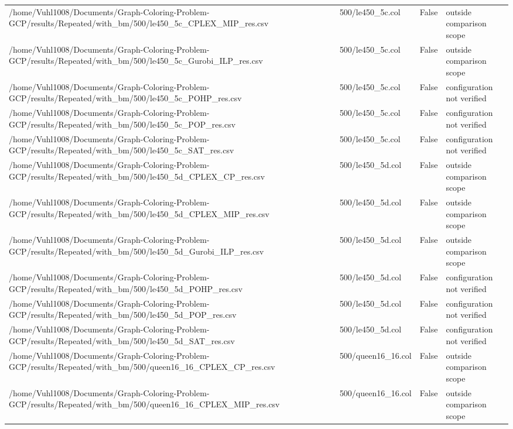 \begin{table}[htbp]
\begin{tabular}{llll}
/home/Vuhl1008/Documents/Graph-Coloring-Problem-GCP/results/Repeated/with\_bm/500/le450\_5c\_CPLEX\_MIP\_res.csv & 500/le450\_5c.col & False & outside comparison scope \\
/home/Vuhl1008/Documents/Graph-Coloring-Problem-GCP/results/Repeated/with\_bm/500/le450\_5c\_Gurobi\_ILP\_res.csv & 500/le450\_5c.col & False & outside comparison scope \\
/home/Vuhl1008/Documents/Graph-Coloring-Problem-GCP/results/Repeated/with\_bm/500/le450\_5c\_POHP\_res.csv & 500/le450\_5c.col & False & configuration not verified \\
/home/Vuhl1008/Documents/Graph-Coloring-Problem-GCP/results/Repeated/with\_bm/500/le450\_5c\_POP\_res.csv & 500/le450\_5c.col & False & configuration not verified \\
/home/Vuhl1008/Documents/Graph-Coloring-Problem-GCP/results/Repeated/with\_bm/500/le450\_5c\_SAT\_res.csv & 500/le450\_5c.col & False & configuration not verified \\
/home/Vuhl1008/Documents/Graph-Coloring-Problem-GCP/results/Repeated/with\_bm/500/le450\_5d\_CPLEX\_CP\_res.csv & 500/le450\_5d.col & False & outside comparison scope \\
/home/Vuhl1008/Documents/Graph-Coloring-Problem-GCP/results/Repeated/with\_bm/500/le450\_5d\_CPLEX\_MIP\_res.csv & 500/le450\_5d.col & False & outside comparison scope \\
/home/Vuhl1008/Documents/Graph-Coloring-Problem-GCP/results/Repeated/with\_bm/500/le450\_5d\_Gurobi\_ILP\_res.csv & 500/le450\_5d.col & False & outside comparison scope \\
/home/Vuhl1008/Documents/Graph-Coloring-Problem-GCP/results/Repeated/with\_bm/500/le450\_5d\_POHP\_res.csv & 500/le450\_5d.col & False & configuration not verified \\
/home/Vuhl1008/Documents/Graph-Coloring-Problem-GCP/results/Repeated/with\_bm/500/le450\_5d\_POP\_res.csv & 500/le450\_5d.col & False & configuration not verified \\
/home/Vuhl1008/Documents/Graph-Coloring-Problem-GCP/results/Repeated/with\_bm/500/le450\_5d\_SAT\_res.csv & 500/le450\_5d.col & False & configuration not verified \\
/home/Vuhl1008/Documents/Graph-Coloring-Problem-GCP/results/Repeated/with\_bm/500/queen16\_16\_CPLEX\_CP\_res.csv & 500/queen16\_16.col & False & outside comparison scope \\
/home/Vuhl1008/Documents/Graph-Coloring-Problem-GCP/results/Repeated/with\_bm/500/queen16\_16\_CPLEX\_MIP\_res.csv & 500/queen16\_16.col & False & outside comparison scope \\

\end{tabular}
\end{table}
